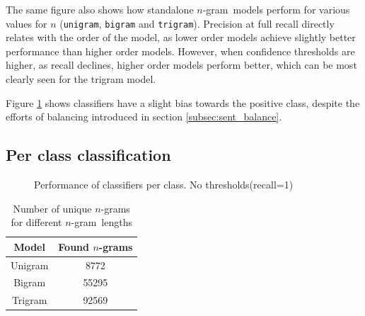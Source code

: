 \documentclass[a4paper,11pt]{kth-mag}
\newcommand{\ngram}{$n$-gram}
\begin{document}
The same figure also shows how standalone \ngram~models perform for various values for $n$
(\texttt{unigram}, \texttt{bigram} and \texttt{trigram}).
Precision at full recall directly relates with the order of the model, as lower order
models achieve slightly better performance than higher order models.
However, when confidence thresholds are higher, as recall declines,
higher order models perform better, which can be most clearly seen for the trigram model.

Figure \ref{fig:sent_bias} shows classifiers have a slight bias towards the positive class, despite the efforts of balancing introduced in section \ref{subsec:sent_balance}.

\newpage

\subsection{Per class classification}
\begin{figure}[h]
  \centering
  \caption{Performance of classifiers per class. No thresholds(recall=1)}
  \label{fig:sent_bias}
\end{figure}


\begin{table}[t]
  \centering
  \begin{tabular}{| c | c |}
    \hline
    \textbf{Model} & \textbf{Found \ngram s}\\ \hline
    Unigram&8772\\
    Bigram&55295\\
    Trigram&92569\\
    \hline
  \end{tabular}
  \caption{Number of unique \ngram s for different \ngram~lengths}
  \label{tab:found_ngrams}
\end{table}
\end{document}
